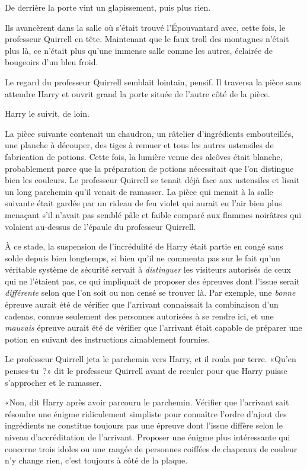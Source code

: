 De derrière la porte vint un glapissement, puis plus rien.

Ils avancèrent dans la salle où s'était trouvé l'Épouvantard avec, cette fois, le professeur Quirrell en tête. Maintenant que le faux troll des montagnes n'était plus là, ce n'était plus qu'une immense salle comme les autres, éclairée de bougeoirs d'un bleu froid.

Le regard du professeur Quirrell semblait lointain, pensif. Il traversa la pièce sans attendre Harry et ouvrit grand la porte située de l'autre côté de la pièce.

Harry le suivit, de loin.

\later

La pièce suivante contenait un chaudron, un râtelier d'ingrédients embouteillés, une planche à découper, des tiges à remuer et tous les autres ustensiles de fabrication de potions. Cette fois, la lumière venue des alcôves était blanche, probablement parce que la préparation de potions nécessitait que l'on distingue bien les couleurs. Le professeur Quirrell se tenait déjà face aux ustensiles et lisait un long parchemin qu'il venait de ramasser. La pièce qui menait à la salle suivante était gardée par un rideau de feu violet qui aurait eu l'air bien plus menaçant s'il n'avait pas semblé pâle et faible comparé aux flammes noirâtres qui volaient au-dessus de l'épaule du professeur Quirrell.

À ce stade, la suspension de l'incrédulité de Harry était partie en congé sans solde depuis bien longtemps, si bien qu'il ne commenta pas sur le fait qu'un véritable système de sécurité servait à \emph{distinguer} les visiteurs autorisés de ceux qui ne l'étaient pas, ce qui impliquait de proposer des épreuves dont l'issue serait \emph{différente} selon que l'on soit ou non censé se trouver là. Par exemple, une \emph{bonne} épreuve aurait été de vérifier que l'arrivant connaissait la combinaison d'un cadenas, connue seulement des personnes autorisées à se rendre ici, et une \emph{mauvais} épreuve aurait été de vérifier que l'arrivant était capable de préparer une potion en suivant des instructions aimablement fournies.

Le professeur Quirrell jeta le parchemin vers Harry, et il roula par terre. «Qu'en penses-tu~?» dit le professeur Quirrell avant de reculer pour que Harry puisse s'approcher et le ramasser.

«Non, dit Harry après avoir parcouru le parchemin. Vérifier que l'arrivant sait résoudre une énigme ridiculement simpliste pour connaître l'ordre d'ajout des ingrédients ne constitue toujours pas une épreuve dont l'issue diffère selon le niveau d'accréditation de l'arrivant. Proposer une énigme plus intéressante qui concerne trois idoles ou une rangée de personnes coiffées de chapeaux de couleur n'y change rien, c'est toujours à côté de la plaque.

